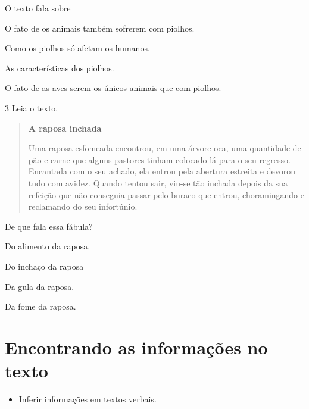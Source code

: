 O texto fala sobre

\begin{escolha}
\item O fato de os animais também sofrerem com piolhos.

\item Como os piolhos só afetam os humanos.

\item As características dos piolhos.

\item O fato de as aves serem os únicos animais que com piolhos.
\end{escolha}


\num{3} Leia o texto.

\begin{quote}
\textbf{A raposa inchada}

Uma raposa esfomeada encontrou, em uma árvore oca, uma quantidade de pão e
carne que alguns pastores tinham colocado lá para o seu regresso.
Encantada com o seu achado, ela entrou pela abertura estreita e devorou
tudo com avidez. Quando tentou sair, viu-se tão inchada depois da sua
refeição que não conseguia passar pelo buraco que entrou, choramingando e reclamando do seu infortúnio.
\end{quote}


De que fala essa fábula?

\begin{escolha}
\item Do alimento da raposa.

\item Do inchaço da raposa

\item Da gula da raposa.

\item Da fome da raposa.
\end{escolha}

\chapter{Encontrando as informações no texto}


\begin{itemize}
\item
Inferir informações em textos verbais.
\end{itemize}


